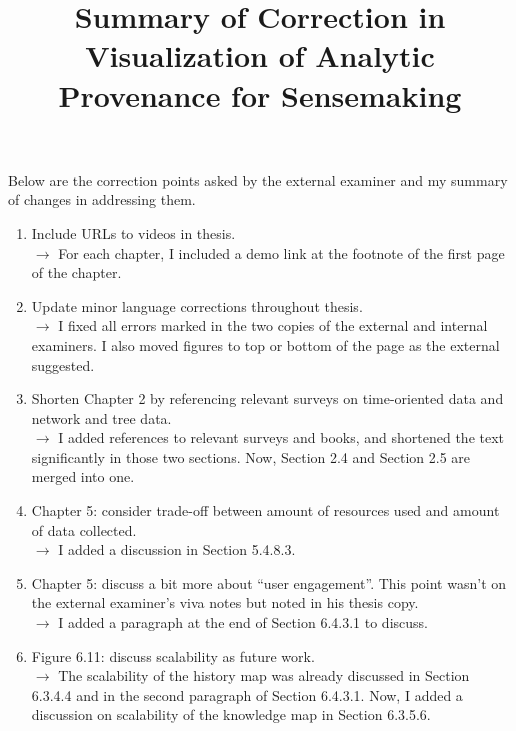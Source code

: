 \documentclass[12pt]{article}
\title{Summary of Correction in \\\textbf{Visualization of Analytic Provenance for Sensemaking}}
\date{}
\begin{document}
\maketitle

Below are the correction points asked by the external examiner and my summary of changes in addressing them.

\begin{enumerate}
	\item Include URLs to videos in thesis.
	\\ $\rightarrow$ For each chapter, I included a demo link at the footnote of the first page of the chapter.
	
	\item Update minor language corrections throughout thesis.
	\\ $\rightarrow$ I fixed all errors marked in the two copies of the external and internal examiners. I also moved figures to top or bottom of the page as the external suggested.
	
	\item Shorten Chapter 2 by referencing relevant surveys on time-oriented data and network and tree data.
	\\ $\rightarrow$ I added references to relevant surveys and books, and shortened the text significantly in those two sections. Now, Section 2.4 and Section 2.5 are merged into one.
	
	\item Chapter 5: consider trade-off between amount of resources used and amount of data collected.
	\\ $\rightarrow$ I added a discussion in Section 5.4.8.3.
	
	\item Chapter 5: discuss a bit more about ``user engagement''. This point wasn't on the external examiner's viva notes but noted in his thesis copy.
	\\ $\rightarrow$ I added a paragraph at the end of Section 6.4.3.1 to discuss.
	
	\item Figure 6.11: discuss scalability as future work.
	\\ $\rightarrow$ The scalability of the history map was already discussed in Section 6.3.4.4 and in the second paragraph of Section 6.4.3.1. Now, I added a discussion on scalability of the knowledge map in Section 6.3.5.6.
\end{enumerate}
\end{document}
